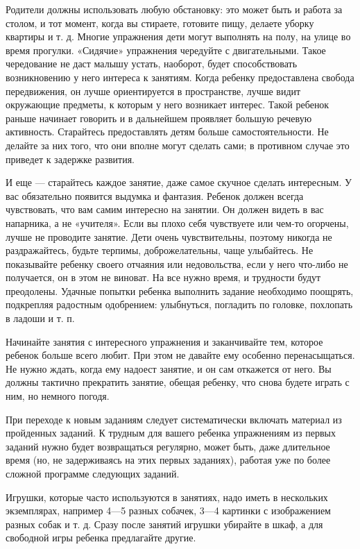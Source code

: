 \documentclass{book}
\begin{document}
Родители должны использовать любую обстановку: это может быть и работа
за столом, и тот момент, когда вы стираете, готовите пищу, делаете
уборку квартиры и т. д. Многие упражнения дети могут выполнять на полу,
на улице во время прогулки. «Сидячие» упражнения чередуйте с
двигательными. Такое чередование не даст малышу устать, наоборот, будет
способствовать возникновению у него интереса к занятиям. Когда ребенку
предоставлена свобода передвижения, он лучше ориентируется в
пространстве, лучше видит окружающие предметы, к которым у него
возникает интерес. Такой ребенок раньше начинает говорить и в дальнейшем
проявляет большую речевую активность. Старайтесь предоставлять детям
больше самостоятельности. Не делайте за них того, что они вполне могут
сделать сами; в противном случае это приведет к задержке развития.

И еще --- старайтесь каждое занятие, даже самое скучное сделать
интересным. У вас обязательно появится выдумка и фантазия. Ребенок
должен всегда чувствовать, что вам самим интересно на занятии. Он должен
видеть в вас напарника, а не «учителя». Если вы плохо себя чувствуете
или чем-то огорчены, лучше не проводите занятие. Дети очень
чувствительны, поэтому никогда не раздражайтесь, будьте терпимы,
доброжелательны, чаще улыбайтесь. Не показывайте ребенку своего отчаяния
или недовольства, если у него что-либо не получается, он в этом не
виноват. На все нужно время, и трудности будут преодолены. Удачные
попытки ребенка выполнить задание необходимо поощрять, подкрепляя
радостным одобрением: улыбнуться, погладить по головке, похлопать в
ладоши и т. п.

Начинайте занятия с интересного упражнения и заканчивайте тем, которое
ребенок больше всего любит. При этом не давайте ему особенно
перенасыщаться. Не нужно ждать, когда ему надоест занятие, и он сам
откажется от него. Вы должны тактично прекратить занятие, обещая
ребенку, что снова будете играть с ним, но немного погодя.

При переходе к новым заданиям следует систематически включать материал
из пройденных заданий. К трудным для вашего ребенка упражнениям из
первых заданий нужно будет возвращаться регулярно, может быть, даже
длительное время (но, не задерживаясь на этих первых заданиях), работая
уже по более сложной программе следующих заданий.

Игрушки, которые часто используются в занятиях, надо иметь в нескольких
экземплярах, например 4---5 разных собачек, 3---4 картинки с
изображением разных собак и т. д. Сразу после занятий игрушки убирайте в
шкаф, а для свободной игры ребенка предлагайте другие.
\end{document}
